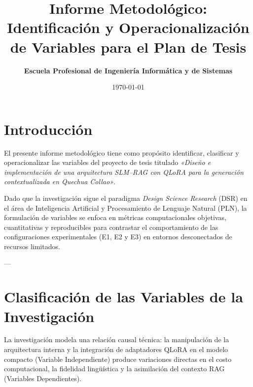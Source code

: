 \documentclass[12pt]{article}
\title{\textbf{Informe Metodológico: Identificación y Operacionalización de Variables para el Plan de Tesis}}
\author{\textbf{Escuela Profesional de Ingeniería Informática y de Sistemas}}
\date{\today}
\begin{document}
\maketitle

\section{Introducción}
El presente informe metodológico tiene como propósito identificar, clasificar y operacionalizar las variables del proyecto de tesis titulado \textit{«Diseño e implementación de una arquitectura SLM--RAG con QLoRA para la generación contextualizada en Quechua Collao»}. 

Dado que la investigación sigue el paradigma \textit{Design Science Research} (DSR) en el área de Inteligencia Artificial y Procesamiento de Lenguaje Natural (PLN), la formulación de variables se enfoca en métricas computacionales objetivas, cuantitativas y reproducibles para contrastar el comportamiento de las configuraciones experimentales (E1, E2 y E3) en entornos desconectados de recursos limitados.

---

\section{Clasificación de las Variables de la Investigación}

La investigación modela una relación causal técnica: la manipulación de la arquitectura interna y la integración de adaptadores QLoRA en el modelo compacto (Variable Independiente) produce variaciones directas en el costo computacional, la fidelidad lingüística y la asimilación del contexto RAG (Variables Dependientes).
\end{document}
